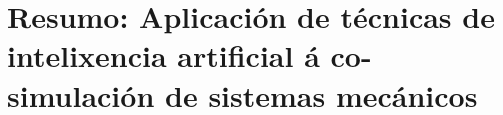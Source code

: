 
\section*{Resumo: Aplicación de técnicas de intelixencia artificial á co-simulación de sistemas mecánicos}






